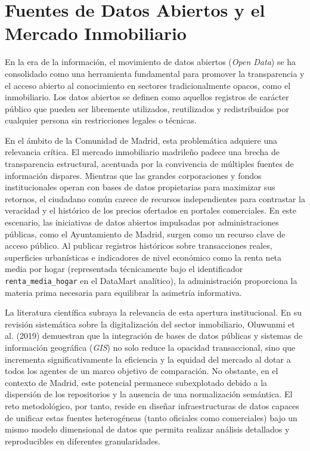 \documentclass[a4paper,11pt,openany]{book}
\begin{document}
\section{Fuentes de Datos Abiertos y el Mercado Inmobiliario}
En la era de la información, el movimiento de datos abiertos (\textit{Open Data}) se ha consolidado como una herramienta fundamental para promover la transparencia y el acceso abierto al conocimiento en sectores tradicionalmente opacos, como el inmobiliario. Los datos abiertos se definen como aquellos registros de carácter público que pueden ser libremente utilizados, reutilizados y redistribuidos por cualquier persona sin restricciones legales o técnicas.

En el ámbito de la Comunidad de Madrid, esta problemática adquiere una relevancia crítica. El mercado inmobiliario madrileño padece una brecha de transparencia estructural, acentuada por la convivencia de múltiples fuentes de información dispares. Mientras que las grandes corporaciones y fondos institucionales operan con bases de datos propietarias para maximizar sus retornos, el ciudadano común carece de recursos independientes para contrastar la veracidad y el histórico de los precios ofertados en portales comerciales. En este escenario, las iniciativas de datos abiertos impulsadas por administraciones públicas, como el Ayuntamiento de Madrid, surgen como un recurso clave de acceso público. Al publicar registros históricos sobre transacciones reales, superficies urbanísticas e indicadores de nivel económico como la renta neta media por hogar (representada técnicamente bajo el identificador \texttt{renta\_media\_hogar} en el DataMart analítico), la administración proporciona la materia prima necesaria para equilibrar la asimetría informativa.

La literatura científica subraya la relevancia de esta apertura institucional. En su revisión sistemática sobre la digitalización del sector inmobiliario, Oluwunmi et al. (2019) demuestran que la integración de bases de datos públicas y sistemas de información geográfica (\textit{GIS}) no solo reduce la opacidad transaccional, sino que incrementa significativamente la eficiencia y la equidad del mercado al dotar a todos los agentes de un marco objetivo de comparación. No obstante, en el contexto de Madrid, este potencial permanece subexplotado debido a la dispersión de los repositorios y la ausencia de una normalización semántica. El reto metodológico, por tanto, reside en diseñar infraestructuras de datos capaces de unificar estas fuentes heterogéneas (tanto oficiales como comerciales) bajo un mismo modelo dimensional de datos que permita realizar análisis detallados y reproducibles en diferentes granularidades.
\end{document}
